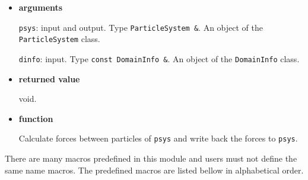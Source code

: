 \begin{itemize}

\item {\bf arguments}

{\tt psys}: input and output. Type {\tt ParticleSystem \&}. An object
of the {\tt ParticleSystem} class.

{\tt dinfo}: input. Type {\tt const DomainInfo \&}. An object of the
{\tt DomainInfo} class.



\item {\bf returned value}

void.

\item {\bf function}

Calculate forces between particles of {\tt psys} and write back the
forces to {\tt psys}.


\end{itemize}




There are many macros predefined in this module and users must not
define the same name macros. The predefined macros are listed bellow
in alphabetical order.


